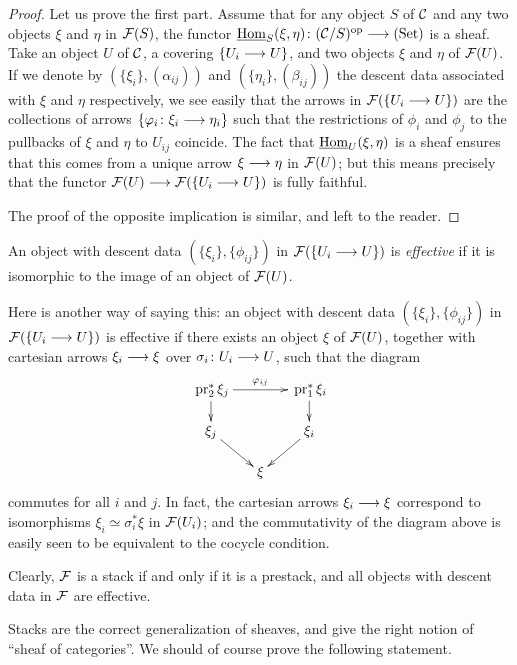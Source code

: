 \begin{4   STACKS}
\begin{4.1 Descent of objects of fibcats}
\begin{proof}
Let us prove the first part. Assume that  for any object $S$ of $\mathcal{C}$ and any two objects $\xi$ and $\eta$ in $\mathcal{F}(S)$, the functor $\underhom_S(\xi, \eta) \colon (\cC/S)\op \arr \catset$ is a sheaf. Take an object $U$ of $\mathcal{C}$, a covering $\{U_i\arr U\}$, and two objects $\xi$ and $\eta$ of $\mathcal{F}(U)$. If we denote by $(\{\xi_i\}, (\alpha_{ij}))$ and $(\{\eta_i\}, (\beta_{ij}))$ the descent data associated with $\xi$ and $\eta$ respectively, we see easily that the arrows in $\mathcal{F}(\{U_i \longrightarrow U\})$ are the collections of arrows $\{\phi_i \colon \xi_i \arr \eta_i\}$ such that the restrictions of $\phi_i$ and $\phi_j$ to the pullbacks of $\xi$ and $\eta$ to $U_{ij}$ coincide. The fact that $\mathop{\underline{\mathrm{Hom}}}\nolimits_U(\xi, \eta )$ is a sheaf ensures that this comes from a unique arrow $\xi \arr \eta$ in $\mathcal{F}(U)$; but this means precisely that the functor $\cF(U) \arr \cF(\{U_i \to U\})$ is fully faithful.

The proof of the opposite implication is similar, and left to the reader.
\end{proof}

\begin{definition}
An object with descent data $(\{\xi_i\}, \{\phi_{ij}\})$ in $\mathcal{F}(\{U_i \longrightarrow U\})$ is \emph{effective}%
 if it is isomorphic to the image of an object of $\mathcal{F}(U)$.
\end{definition}

Here is another way of saying this: an object with descent data $(\{\xi_i\}, \{\phi_{ij}\})$ in $\mathcal{F}(\{U_i \longrightarrow U\})$ is effective if there exists an object $\xi$ of $\mathcal{F}(U)$, together with cartesian arrows $\xi_i \arr \xi$ over $\sigma_i \colon U_i \arr U$, such that the diagram
   \[
   \xymatrix@C-10pt@R-10pt{
   {}\pr_2^* \xi_j \ar[rr]^{\phi_{ij}} \ar[d] &&
   {}\pr_1^* \xi_i \ar[d] \\
   \xi_j \ar[rd] &&
   \xi_i \ar[ld]\\
   &\xi
   }
   \]
commutes for all $i$ and $j$. In fact, the cartesian arrows $\xi_i \arr \xi$ correspond to isomorphisms $\xi_i \simeq \sigma_i^* \xi$ in $\mathcal{F}(U_i)$; and the commutativity of the diagram above  is easily seen to be equivalent to the cocycle condition.

Clearly, $\mathcal{F}$ is a stack if and only if it is a prestack, and all objects with descent data in $\mathcal{F}$ are effective.



Stacks are the correct generalization of sheaves, and give the right notion of ``sheaf of categories''. We should of course prove the following statement.


\end{4.1 Descent of objects of fibcats}
\end{4   STACKS}
